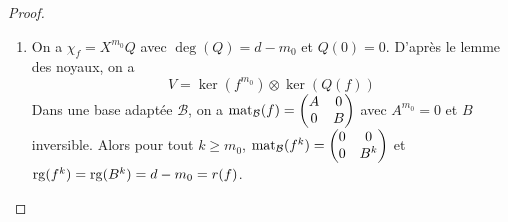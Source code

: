 \documentclass[12pt]{article}
\begin{document}
\begin{proof}
\begin{enumerate}
		\item On a $\chi_{f}=X^{m_{0}}Q$ avec $\deg(Q)=d-m_{0}$ et $Q(0)=0$. D'après le lemme des noyaux, on a 
		\begin{equation}
			V=\ker(f^{m_{0}})\otimes\ker(Q(f))
		\end{equation}
		Dans une base adaptée $\mathcal{B}$, on a $\operatorname{mat}_{\mathcal{B}}(f)=\begin{pmatrix}
			A&0\\0&B
		\end{pmatrix}$ avec $A^{m_{0}}=0$ et $B$ inversible. Alors pour tout $k\geqslant m_{0}$, $\operatorname{mat}_{\mathcal{B}}(f^{k})=\begin{pmatrix}
			0&0\\0&B^{k}
		\end{pmatrix}$ et $\operatorname{rg}(f^{k})=\operatorname{rg}(B^{k})=d-m_{0}=r(f)$.
	\end{enumerate}
\end{proof}
\end{document}
